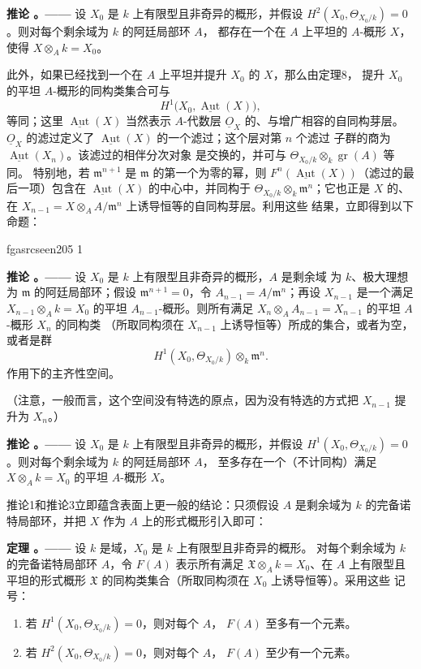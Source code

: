 \documentclass[12pt,twoside,openany]{book}
\numberwithin{equation}{section}
\newcommand{\fgaunitid}{unbound}
\newcommand{\src}[1]{%
  \phantomsection
  \hypertarget{src:\fgaunitid:#1}{}%
  \hypertarget{fga.\fgaunitid.p#1}{}%
  \ifcsname fgasrcseen#1\endcsname\else
    \expandafter\gdef\csname fgasrcseen#1\endcsname{1}%
    \hypertarget{src:#1}{}%
  \fi
  \marginpar{\raggedleft\footnotesize\sffamily #1}%
}
\newcommand{\Osh}{\underline{O}}
\theoremstyle{plain}
\theoremstyle{definition}
\theoremstyle{remark}
\newcommand{\result}[2]{%
  \par\medskip\noindent\textbf{#1%
  \if\relax\detokenize{#2}\relax\else\space#2\fi。——}\enspace
}
\begin{document}
\result{推论}{1} 设 $X_0$ 是 $k$ 上有限型且非奇异的概形，并假设
$H^2(X_0,\Theta_{X_0/k})=0$。则对每个剩余域为 $k$ 的阿廷局部环 $A$，
都存在一个在 $A$ 上平坦的 $A$-概形 $X$，使得
$X\otimes_A k=X_0$。

此外，如果已经找到一个在 $A$ 上平坦并提升 $X_0$ 的 $X$，那么由定理8，
提升 $X_0$ 的平坦 $A$-概形的同构类集合可与
\[
  H^1\bigl(X_0,\underline{\operatorname{Aut}}(X)\bigr),
\]
等同；这里 $\underline{\operatorname{Aut}}(X)$ 当然表示 $A$-代数层
$\Osh_X$ 的、与增广相容的自同构芽层。$\Osh_X$ 的滤过定义了
$\underline{\operatorname{Aut}}(X)$ 的一个滤过；这个层对第 $n$ 个滤过
子群的商为 $\underline{\operatorname{Aut}}(X_n)$。该滤过的相伴分次对象
是交换的，并可与 $\Theta_{X_0/k}\otimes_k\operatorname{gr}(A)$ 等同。
特别地，若 $\mathfrak m^{n+1}$ 是 $\mathfrak m$ 的第一个为零的幂，则
$F^n(\underline{\operatorname{Aut}}(X))$（滤过的最后一项）包含在
$\underline{\operatorname{Aut}}(X)$ 的中心中，并同构于
$\Theta_{X_0/k}\otimes_k\mathfrak m^n$；它也正是 $X$ 的、在
$X_{n-1}=X\otimes_A A/\mathfrak m^n$ 上诱导恒等的自同构芽层。利用这些
结果，立即得到以下命题：

\src{205}
\result{推论}{2} 设 $X_0$ 是 $k$ 上有限型且非奇异的概形，$A$ 是剩余域
为 $k$、极大理想为 $\mathfrak m$ 的阿廷局部环；假设
$\mathfrak m^{n+1}=0$，令 $A_{n-1}=A/\mathfrak m^n$；再设 $X_{n-1}$
是一个满足 $X_{n-1}\otimes_A k=X_0$ 的平坦 $A_{n-1}$-概形。则所有满足
$X_n\otimes_A A_{n-1}=X_{n-1}$ 的平坦 $A$-概形 $X_n$ 的同构类
（所取同构须在 $X_{n-1}$ 上诱导恒等）所成的集合，或者为空，或者是群
\[
  H^1(X_0,\Theta_{X_0/k})\otimes_k\mathfrak m^n.
\]
作用下的主齐性空间。

（注意，一般而言，这个空间没有特选的原点，因为没有特选的方式把
$X_{n-1}$ 提升为 $X_n$。）

\result{推论}{3} 设 $X_0$ 是 $k$ 上有限型且非奇异的概形，并假设
$H^1(X_0,\Theta_{X_0/k})=0$。则对每个剩余域为 $k$ 的阿廷局部环 $A$，
至多存在一个（不计同构）满足 $X\otimes_A k=X_0$ 的平坦 $A$-概形 $X$。

推论1和推论3立即蕴含表面上更一般的结论：只须假设 $A$ 是剩余域为 $k$
的完备诺特局部环，并把 $X$ 作为 $A$ 上的形式概形引入即可：

\result{定理}{9} 设 $k$ 是域，$X_0$ 是 $k$ 上有限型且非奇异的概形。
对每个剩余域为 $k$ 的完备诺特局部环 $A$，令 $F(A)$ 表示所有满足
$\mathfrak X\otimes_A k=X_0$、在 $A$ 上有限型且平坦的形式概形
$\mathfrak X$ 的同构类集合（所取同构须在 $X_0$ 上诱导恒等）。采用这些
记号：
\begin{enumerate}
  \item[\textit{i.}] 若 $H^1(X_0,\Theta_{X_0/k})=0$，则对每个 $A$，
    $F(A)$ 至多有一个元素。
  \item[\textit{ii.}] 若 $H^2(X_0,\Theta_{X_0/k})=0$，则对每个 $A$，
    $F(A)$ 至少有一个元素。
\end{enumerate}
\end{document}
